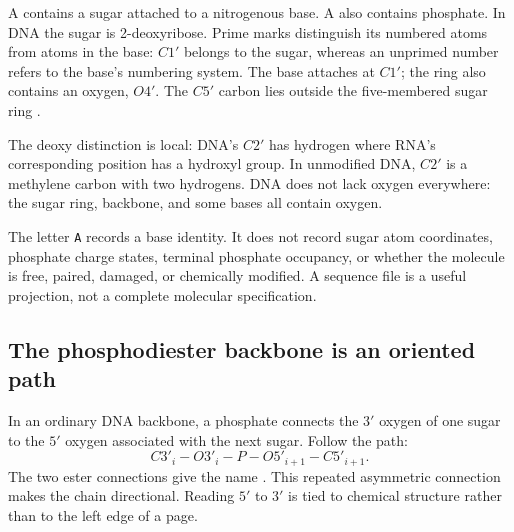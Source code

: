 A  contains a sugar attached to a nitrogenous base.
A  also contains phosphate. In DNA the sugar is
2-deoxyribose. Prime marks distinguish its numbered atoms from atoms in the
base: $C1'$ belongs to the sugar, whereas an unprimed number refers to the
base's numbering system. The base attaches at $C1'$; the ring also contains
an oxygen, $O4'$. The $C5'$ carbon lies outside the five-membered sugar ring
\cite{iupac-conformation,iupac-symbols}.


The deoxy distinction is local: DNA's $C2'$ has hydrogen where RNA's
corresponding position has a hydroxyl group. In unmodified DNA, $C2'$ is a
methylene carbon with two hydrogens. DNA does not lack oxygen everywhere:
the sugar ring, backbone, and some bases all contain oxygen.

The letter \texttt{A} records a base identity. It does not record sugar atom
coordinates, phosphate charge states, terminal phosphate occupancy, or
whether the molecule is free, paired, damaged, or chemically modified.
A sequence file is a useful projection, not a complete molecular specification.

\subsection{The phosphodiester backbone is an oriented path}

In an ordinary DNA backbone, a phosphate connects the $3'$ oxygen of one
sugar to the $5'$ oxygen associated with the next sugar. Follow the path:
\begin{equation}
C3'_i-O3'_i-P-O5'_{i+1}-C5'_{i+1}.
\label{eq:backbone}
\end{equation}
The two ester connections give the name . This repeated
asymmetric connection makes the chain directional. Reading $5'$ to $3'$
is tied to chemical structure rather than to the left edge of a page.


